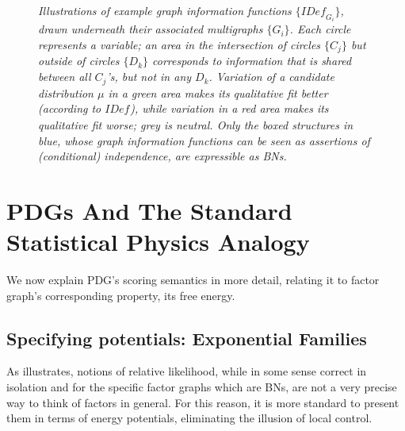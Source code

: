\documentclass{article}
\theoremstyle{plain}
\theoremstyle{definition}
\theoremstyle{remark}
\renewcommand\thesubfigure{(\alph{subfigure})}
\newcommand{\IDef}[1]{\mathit{IDef}_{#1}}
\numberwithin{equation}{section}
\begin{document}
\begin{vfull}
\begin{figure}
{
}
\addtocounter{figure}{-1} %
\caption{\itshape Illustrations of example graph information
	  functions $\{ \IDef{G_i} \}$, drawn underneath their
	  associated multigraphs $\{ G_i\}$. Each circle represents a
	  variable; an area in the intersection of circles $\{C_j\}$
	  but outside of circles $\{D_k\}$ corresponds to information
	  that is shared between all $C_j$'s, but not in any
	  $D_k$. Variation of a candidate distribution $\mu$ in a
	  green area makes its qualitative fit better (according to
	  $\IDef{}$), while variation in a red area makes its
	  qualitative fit worse; grey is neutral. Only the boxed
	  structures in blue, whose graph information functions can be
	  seen as assertions of (conditional) independence, are
	  expressible as BNs.} 

\label{fig:info-diagram}
\end{figure}
\end{vfull}


\section{PDGs And The Standard Statistical Physics Analogy}
We now explain PDG's scoring semantics in more detail, relating it to factor graph's corresponding property, its free energy.

\subsection{Specifying potentials: Exponential
	  Families}\label{sec:fg-expfam}

As  illustrates, notions of relative likelihood, while in some sense correct in isolation and for the specific factor graphs which are BNs, are not a very precise way to think of factors in general. 
For this reason, it is more standard to present them in terms of energy potentials, eliminating the illusion of local control. 
\end{document}
